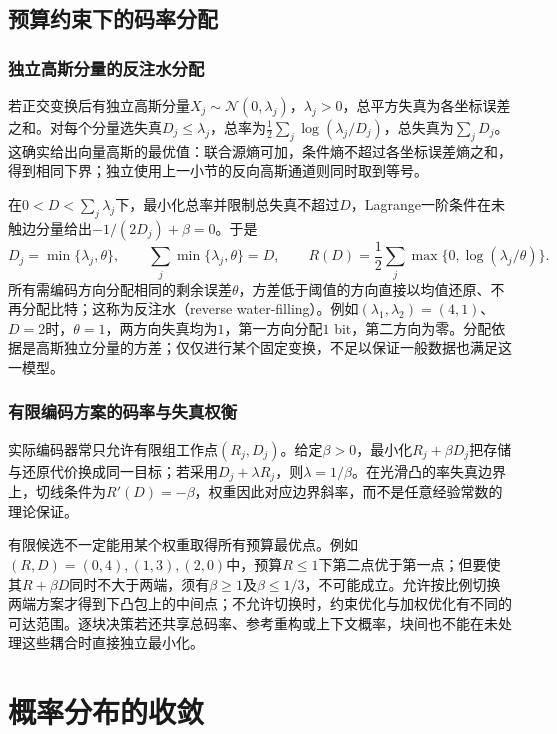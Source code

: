 \subsection{预算约束下的码率分配}
\label{sec:information-rate-allocation}

\subsubsection{独立高斯分量的反注水分配}
若正交变换后有独立高斯分量\(X_j\sim\mathcal N(0,\lambda_j)\)，\(\lambda_j>0\)，总平方失真为各坐标误差之和。对每个分量选失真\(D_j\leq\lambda_j\)，总率为\(\tfrac12\sum_j\log(\lambda_j/D_j)\)，总失真为\(\sum_jD_j\)。这确实给出向量高斯的最优值：联合源熵可加，条件熵不超过各坐标误差熵之和，得到相同下界；独立使用上一小节的反向高斯通道则同时取到等号。

在\(0<D<\sum_j\lambda_j\)下，最小化总率并限制总失真不超过\(D\)，Lagrange一阶条件在未触边分量给出\(-1/(2D_j)+\beta=0\)。于是
\[
 D_j=\min\{\lambda_j,\theta\},\qquad
 \sum_j\min\{\lambda_j,\theta\}=D,
 \qquad
 R(D)=\frac12\sum_j\max\{0,\log(\lambda_j/\theta)\}.
\]
所有需编码方向分配相同的剩余误差\(\theta\)，方差低于阈值的方向直接以均值还原、不再分配比特；这称为反注水（reverse water-filling）。例如\((\lambda_1,\lambda_2)=(4,1)\)、\(D=2\)时，\(\theta=1\)，两方向失真均为\(1\)，第一方向分配\(1\) bit，第二方向为零。分配依据是高斯独立分量的方差；仅仅进行某个固定变换，不足以保证一般数据也满足这一模型。

\subsubsection{有限编码方案的码率与失真权衡}
实际编码器常只允许有限组工作点\((R_j,D_j)\)。给定\(\beta>0\)，最小化\(R_j+\beta D_j\)把存储与还原代价换成同一目标；若采用\(D_j+\lambda R_j\)，则\(\lambda=1/\beta\)。在光滑凸的率失真边界上，切线条件为\(R'(D)=-\beta\)，权重因此对应边界斜率，而不是任意经验常数的理论保证。

有限候选不一定能用某个权重取得所有预算最优点。例如\((R,D)=(0,4),(1,3),(2,0)\)中，预算\(R\leq1\)下第二点优于第一点；但要使其\(R+\beta D\)同时不大于两端，须有\(\beta\geq1\)及\(\beta\leq1/3\)，不可能成立。允许按比例切换两端方案才得到下凸包上的中间点；不允许切换时，约束优化与加权优化有不同的可达范围。逐块决策若还共享总码率、参考重构或上下文概率，块间也不能在未处理这些耦合时直接独立最小化。

\section{概率分布的收敛}
\label{sec:information-distribution-convergence}

